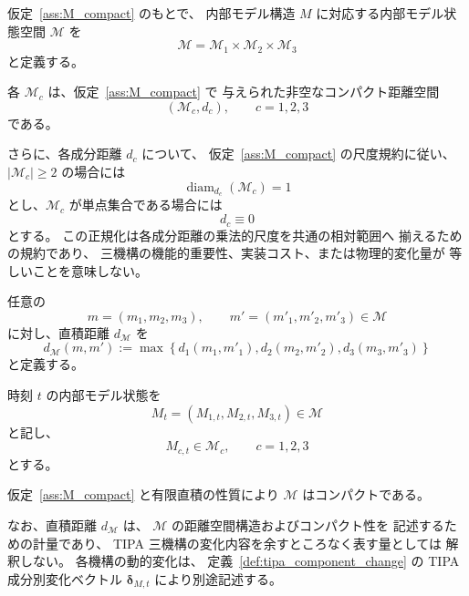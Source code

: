 \begin{definition}[内部モデル状態空間]
\label{def:model_parameter_space}

仮定~\ref{ass:M_compact} のもとで、
内部モデル構造 $M$ に対応する内部モデル状態空間
$\mathcal{M}$ を
\[
  \mathcal{M}
  =
  \mathcal{M}_1
  \times
  \mathcal{M}_2
  \times
  \mathcal{M}_3
\]
と定義する。

各 $\mathcal{M}_c$ は、仮定~\ref{ass:M_compact} で
与えられた非空なコンパクト距離空間
\[
  (\mathcal{M}_c,d_c),
  \qquad
  c=1,2,3
\]
である。

さらに、各成分距離 $d_c$ について、
仮定~\ref{ass:M_compact} の尺度規約に従い、
$|\mathcal{M}_c|\geq2$ の場合には
\[
  \operatorname{diam}_{d_c}(\mathcal{M}_c)=1
\]
とし、$\mathcal{M}_c$ が単点集合である場合には
\[
  d_c\equiv0
\]
とする。
この正規化は各成分距離の乗法的尺度を共通の相対範囲へ
揃えるための規約であり、
三機構の機能的重要性、実装コスト、または物理的変化量が
等しいことを意味しない。

任意の
\[
  m=(m_1,m_2,m_3),
  \qquad
  m'=(m'_1,m'_2,m'_3)
  \in\mathcal{M}
\]
に対し、直積距離 $d_{\mathcal{M}}$ を
\[
  d_{\mathcal{M}}(m,m')
  :=
  \max\left\{
    d_1(m_1,m'_1),
    d_2(m_2,m'_2),
    d_3(m_3,m'_3)
  \right\}
\]
と定義する。

時刻 $t$ の内部モデル状態を
\[
  M_t
  =
  (M_{1,t},M_{2,t},M_{3,t})
  \in\mathcal{M}
\]
と記し、
\[
  M_{c,t}\in\mathcal{M}_c,
  \qquad
  c=1,2,3
\]
とする。

仮定~\ref{ass:M_compact} と有限直積の性質により
$\mathcal{M}$ はコンパクトである。

なお、直積距離 $d_{\mathcal{M}}$ は、
$\mathcal{M}$ の距離空間構造およびコンパクト性を
記述するための計量であり、
TIPA 三機構の変化内容を余すところなく表す量としては
解釈しない。
各機構の動的変化は、
定義~\ref{def:tipa_component_change} の
TIPA成分別変化ベクトル
$\boldsymbol{\delta}_{M,t}$ により別途記述する。
\end{definition}

